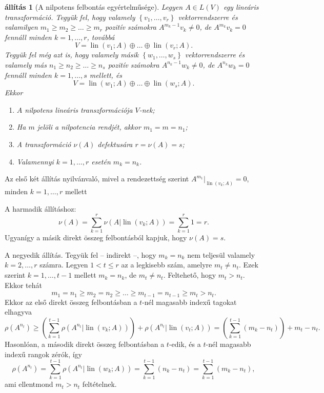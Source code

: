 \documentclass[a4paper, showtrims]{memoir}
\makeatletter
\renewenvironment{proof}[1][\proofname]
    {\par\pushQED{\qed}%
    \normalfont \topsep6\p@\@plus6\p@\relax
    \trivlist
    \item[\hskip\labelsep
        \itshape
    #1\@addpunct{:}]\ignorespaces}
    {\popQED\endtrivlist\@endpefalse}
\theoremstyle{plain}
\newtheorem{proposition}{állítás}[chapter]
\theoremstyle{remark}
\theoremstyle{definition}
\DeclareMathOperator{\lin}{lin}
\makeatother
\begin{document}
\begin{proposition}[A nilpotens felbontás egyértelműsége]
	Legyen $A\in L\left( V \right)$ egy lineáris transzformáció.
	Tegyük fel, hogy valamely $\left\{ v_1,\ldots,v_r \right\}$ vektorrendszerre és valamilyen
	$m_1\geq m_2\geq \dots\geq m_r$ pozitív számokra
	$A^{m_k-1}v_k\neq 0$, de $A^{m_k}v_k=0$ fennáll minden $k=1,\ldots,r$, továbbá
	\[
		V=\lin(v_1;A)\oplus \dots \oplus\lin(v_r;A).
	\]
	Tegyük fel még azt is,
	hogy valamely másik $\left\{ w_1,\ldots,w_s \right\}$ vektorrendszerre és valamely más
	$n_1\geq n_2\geq \dots\geq n_s$ pozitív számokra
	$A^{n_k-1}w_k\neq 0$, de $A^{n_k}w_k=0$ fennáll minden $k=1,\ldots,s$ mellett, és
	\[
		V=\lin(w_1;A)\oplus \dots \oplus\lin(w_s;A).
	\]
	Ekkor
	\begin{enumerate}
		\item $A$ nilpotens lineáris transzformációja $V$-nek;
		\item Ha $m$ jelöli a nilpotencia rendjét, akkor
		      \(
		      m_1=m=n_1
		      \);
		\item A transzformáció $\nu\left( A \right)$ defektusára
		      \(
		      r=\nu\left( A \right)=s
		      \);
		\item Valamennyi $k=1,\ldots,r$ esetén
		      \(
		      m_k=n_k
		      \).\qedhere
	\end{enumerate}
\end{proposition}
\begin{proof}
	Az első két állítás nyilvánvaló, mivel a rendezettség szerint
    $A^{m_1}|_{\lin(v_k;A)}=0$,
	minden $k=1,\ldots,r$ mellett

	A harmadik állításhoz:
	\[
		\nu\left( A \right)=\sum_{k=1}^r\nu\left( A|\lin(v_k;A) \right)=
		\sum_{k=1}^r1=r.
	\]
	Ugyanígy a másik direkt összeg felbontásból kapjuk, hogy $\nu\left( A \right)=s$.

	A negyedik állítás.
	Tegyük fel -- indirekt --, hogy $m_k=n_k$ nem teljesül valamely $k=2,\ldots,r$ számra.
	Legyen $1<t\leq r$ az a legkisebb szám, amelyre $m_t\neq n_t$.
	Ezek szerint $k=1,\ldots,t-1$ mellett $m_k=n_k$, de $m_t\neq n_t$.
	Feltehető, hogy $m_t>n_t$.
	Ekkor tehát
	\[
		m_1=n_1\geq m_2=n_2\geq\dots\geq m_{t-1}=n_{t-1}\geq m_t>n_t.
	\]
	Ekkor az első direkt összeg felbontásban a $t$-nél magasabb indexű tagokat elhagyva
	\[
		\rho\left( A^{n_t} \right)
		\geq
		\left( \sum_{k=1}^{t-1}\rho\left( A^{n_t}|\lin(v_k;A) \right) \right)
		+\rho\left( A^{n_t}|\lin(v_t;A) \right)
		=
		\left( \sum_{k=1}^{t-1}(m_k-n_t) \right)+m_t-n_t.
	\]
	Hasonlóan, a második direkt összeg felbontásban a $t$-edik, és a $t$-nél magasabb indexű rangok zérók, így
	\[
		\rho\left( A^{n_t} \right)
		=
		\sum_{k=1}^{t-1}\rho\left( A^{n_t}|\lin(w_k;A) \right)
		=
		\sum_{k=1}^{t-1}(n_k-n_t)
		=
		\sum_{k=1}^{t-1}(m_k-n_t),
	\]
	ami ellentmond $m_t>n_t$ feltételnek.
\end{proof}
\end{document}
